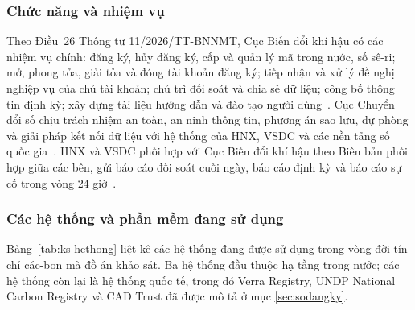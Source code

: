 \subsubsection*{Chức năng và nhiệm vụ}

Theo Điều~26 Thông tư 11/2026/TT-BNNMT, Cục Biến đổi khí hậu có các nhiệm vụ chính: đăng ký, hủy đăng ký, cấp và quản lý mã trong nước, số sê-ri; mở, phong tỏa, giải tỏa và đóng tài khoản đăng ký; tiếp nhận và xử lý đề nghị nghiệp vụ của chủ tài khoản; chủ trì đối soát và chia sẻ dữ liệu; công bố thông tin định kỳ; xây dựng tài liệu hướng dẫn và đào tạo người dùng~\cite{vietnam2026thongtu11}. Cục Chuyển đổi số chịu trách nhiệm an toàn, an ninh thông tin, phương án sao lưu, dự phòng và giải pháp kết nối dữ liệu với hệ thống của HNX, VSDC và các nền tảng số quốc gia~\cite{vietnam2026thongtu11}. HNX và VSDC phối hợp với Cục Biến đổi khí hậu theo Biên bản phối hợp giữa các bên, gửi báo cáo đối soát cuối ngày, báo cáo định kỳ và báo cáo sự cố trong vòng 24 giờ~\cite{vietnam2026thongtu11}.

\subsubsection*{Các hệ thống và phần mềm đang sử dụng}

Bảng~\ref{tab:ks-hethong} liệt kê các hệ thống đang được sử dụng trong vòng đời tín chỉ các-bon mà đồ án khảo sát. Ba hệ thống đầu thuộc hạ tầng trong nước; các hệ thống còn lại là hệ thống quốc tế, trong đó Verra Registry, UNDP National Carbon Registry và CAD Trust đã được mô tả ở mục \ref{sec:sodangky}.

